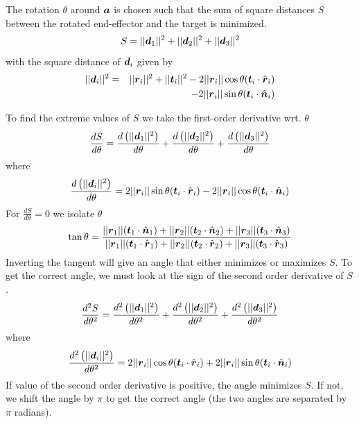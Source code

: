 The rotation $\theta$ around $\boldsymbol{a}$ is chosen such that the sum of square distances $S$ between the rotated end-effector and the target is minimized.
$$S=||\boldsymbol{d}_1||^2+||\boldsymbol{d}_2||^2+||\boldsymbol{d}_3||^2$$
with the square distance of $\boldsymbol{d}_i$ given by
\begin{eqnarray*}
||\boldsymbol{d}_i||^2 &=& ||\boldsymbol{r}_i||^2 + ||\boldsymbol{t}_i||^2 - 2||\boldsymbol{r}_i||\cos\theta(\boldsymbol{t}_i\cdot\hat{\boldsymbol{r}}_i)\\
&& - 2||\boldsymbol{r}_i||\sin\theta(\boldsymbol{t}_i\cdot\hat{\boldsymbol{n}}_i)
\end{eqnarray*}

To find the extreme values of $S$ we take the first-order derivative wrt. $\theta$
$$\dfrac{dS}{d\theta} = \dfrac{d\left(||\boldsymbol{d}_1||^2\right)}{d\theta} + \dfrac{d\left(||\boldsymbol{d}_2||^2\right)}{d\theta} + \dfrac{d\left(||\boldsymbol{d}_3||^2\right)}{d\theta}$$
where
$$\dfrac{d\left(||\boldsymbol{d}_i||^2\right)}{d\theta} = 2||\boldsymbol{r}_i||\sin\theta(\boldsymbol{t}_i\cdot\hat{\boldsymbol{r}}_i) - 2||\boldsymbol{r}_i||\cos\theta(\boldsymbol{t}_i\cdot\hat{\boldsymbol{n}}_i)$$
For $\frac{dS}{d\theta} = 0$ we isolate $\theta$
\begin{eqnarray*}
\tan\theta = \dfrac{||\boldsymbol{r}_1||(\boldsymbol{t}_1\cdot\hat{\boldsymbol{n}}_1) + ||\boldsymbol{r}_2||(\boldsymbol{t}_2\cdot\hat{\boldsymbol{n}}_2) + ||\boldsymbol{r}_3||(\boldsymbol{t}_3\cdot\hat{\boldsymbol{n}}_3)}{||\boldsymbol{r}_1||(\boldsymbol{t}_1\cdot\hat{\boldsymbol{r}}_1) + ||\boldsymbol{r}_2||(\boldsymbol{t}_2\cdot\hat{\boldsymbol{r}}_2) + ||\boldsymbol{r}_3||(\boldsymbol{t}_3\cdot\hat{\boldsymbol{r}}_3)}
\\
\end{eqnarray*}
Inverting the tangent will give an angle that either minimizes or maximizes $S$.
To get the correct angle, we must look at the sign of the second order derivative of $S$.
\begin{eqnarray*}
\dfrac{d^2S}{d\theta^2} = \dfrac{d^2\left(||\boldsymbol{d}_1||^2\right)}{d\theta^2} + \dfrac{d^2\left(||\boldsymbol{d}_2||^2\right)}{d\theta^2} + \dfrac{d^2\left(||\boldsymbol{d}_3||^2\right)}{d\theta^2}
\end{eqnarray*}
where 
\begin{eqnarray*}
\dfrac{d^2\left(||\boldsymbol{d}_i||^2\right)}{d\theta^2} = 2||\boldsymbol{r}_i||\cos\theta(\boldsymbol{t}_i\cdot\hat{\boldsymbol{r}}_i) + 2||\boldsymbol{r}_i||\sin\theta(\boldsymbol{t}_i\cdot\hat{\boldsymbol{n}}_i)
\end{eqnarray*}
If value of the second order derivative is positive, the angle minimizes $S$. 
If not, we shift the angle by $\pi$ to get the correct angle (the two angles are separated by $\pi$ radians).

